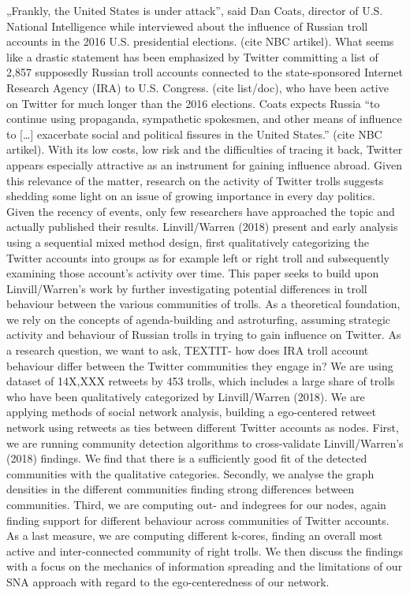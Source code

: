 \documentclass[12pt, titlepage=true, toc=bib]{scrartcl}
\begin{document}
„Frankly, the United States is under attack”, said Dan Coats, director of U.S. National Intelligence while interviewed about the influence of Russian troll accounts in the 2016 U.S. presidential elections. (cite NBC artikel). What seems like a drastic statement has been emphasized by Twitter committing a list of 2,857 supposedly Russian troll accounts connected to the state-sponsored Internet Research Agency (IRA) to U.S. Congress. (cite list/doc), who have been active on Twitter for much longer than the 2016 elections. Coats expects Russia “to continue using propaganda, sympathetic spokesmen, and other means of influence to […] exacerbate social and political fissures in the United States.” (cite NBC artikel). With its low costs, low risk and the difficulties of tracing it back, Twitter appears especially attractive as an instrument for gaining influence abroad. Given this relevance of the matter, research on the activity of Twitter trolls suggests shedding some light on an issue of growing importance in every day politics. Given the recency of events, only few researchers have approached the topic and actually published their results. Linvill/Warren (2018) present and early analysis using a sequential mixed method design, first qualitatively categorizing the Twitter accounts into groups as for example left or right troll and subsequently examining those account’s activity over time. This paper seeks to build upon Linvill/Warren’s work by further investigating potential differences in troll behaviour between the various communities of trolls. As a theoretical foundation, we rely on the concepts of agenda-building and astroturfing, assuming strategic activity and behaviour of Russian trolls in trying to gain influence on Twitter. As a research question, we want to ask, TEXTIT- how does IRA troll account behaviour differ between the Twitter communities they engage in? We are using dataset of 14X,XXX retweets by 453 trolls, which includes a large share of trolls who have been qualitatively categorized by Linvill/Warren (2018). We are applying methods of social network analysis, building a ego-centered retweet network using retweets as ties between different Twitter accounts as nodes. First, we are running community detection algorithms to cross-validate Linvill/Warren’s (2018) findings. We find that there is a sufficiently good fit of the detected communities with the qualitative categories. Secondly, we analyse the graph densities in the different communities finding strong differences between communities. Third, we are computing out- and indegrees for our nodes, again finding support for different behaviour across communities of Twitter accounts. As a last measure, we are computing different k-cores, finding an overall most active and inter-connected community of right trolls. We then discuss the findings with a focus on the mechanics of information spreading and the limitations of our SNA approach with regard to the ego-centeredness of our network.
\end{document}
